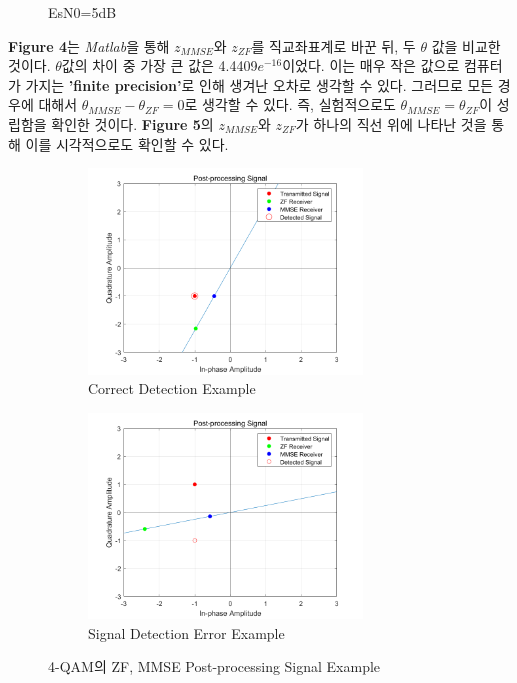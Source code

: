 \documentclass{article}
\newcommand{\bd}{\textbf} %
\begin{document}
\begin{figure}[H]
	\centering
	\caption{EsN0=5dB}
\end{figure}
\bd{Figure 4}는 \textsl{Matlab}을 통해 $z_{MMSE}$와 $z_{ZF}$를 직교좌표계로 바꾼 뒤, 두 $\theta$ 값을 비교한 것이다. $\theta$값의 차이 중 가장 큰 값은 4.4409$e^{-16}$이었다. 이는 매우 작은 값으로 컴퓨터가 가지는 \bd{'finite precision'}로 인해 생겨난 오차로 생각할 수 있다. 그러므로 모든 경우에 대해서 $\theta_{MMSE}-\theta_{ZF}=0$로 생각할 수 있다. 즉, 실험적으로도 $\theta_{MMSE}=\theta_{ZF}$이 성립함을 확인한 것이다. \bd{Figure 5}의 $z_{MMSE}$와 $z_{ZF}$가 하나의 직선 위에 나타난 것을 통해 이를 시각적으로도 확인할 수 있다.
\begin{figure}[H]
	\centering
	\begin{subfigure}{0.5\textwidth}
		\centerline{\includegraphics[width=0.8\textwidth]{4qam_correct.png}}
		\caption{Correct Detection Example}
	\end{subfigure}%
	\begin{subfigure}{0.5\textwidth}
		\centerline{\includegraphics[width=0.8\textwidth]{4qam_error.png}}
		\caption{Signal Detection Error Example}
	\end{subfigure}
	\caption{4-QAM의 ZF, MMSE Post-processing Signal Example}
\end{figure}
\end{document}
